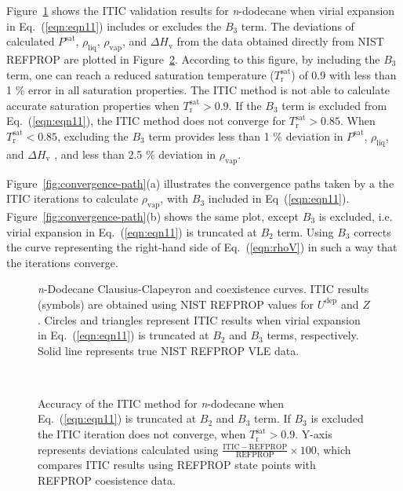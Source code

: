 \documentclass[5p,times]{elsarticle}
\begin{document}
Figure~\ref{fig:NIST-VALIDATION_C12_FTT} shows the ITIC validation results for \textit{n}-dodecane when virial expansion in Eq.~(\ref{eqn:eqn11}) includes or excludes the $B_{3}$ term. The deviations of calculated $P^{\mathrm{sat}}$, $\rho_{\mathrm{liq}}$, $\rho_{\mathrm{vap}}$, and $\Delta H_{\mathrm{v}}$ from the data obtained directly from NIST REFPROP \cite{Lemmon2004} are plotted in Figure~\ref{fig:Nist-Val-Deviation}. According to this figure, by including the $B_3$ term, one can reach a reduced saturation temperature ($T_\mathrm{r}^{\mathrm{sat}}$) of 0.9 with less than 1 \% error in all saturation properties. The ITIC method is not able to calculate accurate saturation properties when $T_\mathrm{r}^{\mathrm{sat}}>0.9$. If the $B_3$ term is excluded from Eq.~(\ref{eqn:eqn11}), the ITIC method does not converge for $T_\mathrm{r}^{\mathrm{sat}} > 0.85$. When $T_\mathrm{r}^{\mathrm{sat}} < 0.85$, excluding the $B_3$ term provides less than 1 \% deviation in $P^{\mathrm{sat}}$, $\rho_{\mathrm{liq}}$, and $\Delta H_{\mathrm{v}}$ , and less than 2.5 \% deviation in $\rho_{\mathrm{vap}}$.

Figure~\ref{fig:convergence-path}(a) illustrates the convergence paths taken by a the ITIC iterations to calculate $\rho_{\mathrm{vap}}$, with $B_3$ included in Eq~(\ref{eqn:eqn11}). Figure~\ref{fig:convergence-path}(b) shows the same plot, except $B_3$ is excluded, i.e. virial expansion in Eq.~(\ref{eqn:eqn11}) is truncated at $B_{2}$ term. Using $B_3$ corrects the curve representing the right-hand side of Eq.~(\ref{eqn:rhoV}) in such a way that the iterations converge.

\begin{figure}
\centering
{}
\caption{\textit{n}-Dodecane Clausius-Clapeyron and coexistence curves. ITIC results (symbols) are obtained using NIST REFPROP \cite{Lemmon2004} values for $U^{\mathrm{dep}}$ and $Z$. Circles and triangles represent ITIC results when virial expansion in Eq.~(\ref{eqn:eqn11}) is truncated at $B_2$ and $B_3$ terms, respectively. Solid line represents true NIST REFPROP VLE data.
}
\label{fig:NIST-VALIDATION_C12_FTT}
\end{figure}


\begin{figure}
\centering
{}
\
\subfloat[]{\texttt{[image: Figures/Nist-Val-Deviation-Hvap.png]}}
\caption{
Accuracy of the ITIC method for \textit{n}-dodecane when Eq.~(\ref{eqn:eqn11}) is truncated at $B_2$ and $B_3$ term. If $B_3$ is excluded the ITIC iteration does not converge, when $T_\mathrm{r}^{\mathrm{sat}}>0.9$. Y-axis represents deviations calculated using $\frac{\mathrm{ITIC - REFPROP}}{\mathrm{REFPROP}} \times 100$, which compares ITIC results using REFPROP state points with REFPROP coesistence data.
}
\label{fig:Nist-Val-Deviation}
\end{figure}
\end{document}
